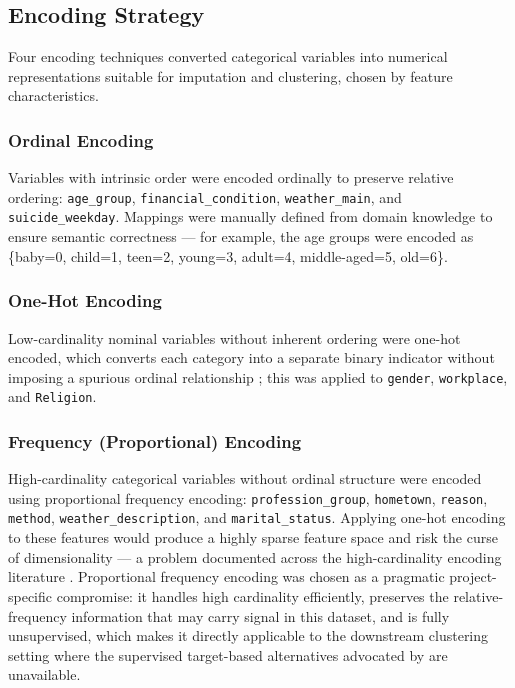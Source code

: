 \subsection{Encoding Strategy}

Four encoding techniques converted categorical variables into numerical representations suitable for imputation and clustering, chosen by feature characteristics.

\subsubsection{Ordinal Encoding}

Variables with intrinsic order were encoded ordinally to preserve relative ordering: \texttt{age\_group}, \texttt{financial\_condition}, \texttt{weather\_main}, and \texttt{suicide\_weekday}. Mappings were manually defined from domain knowledge to ensure semantic correctness --- for example, the age groups were encoded as \{baby=0, child=1, teen=2, young=3, adult=4, middle-aged=5, old=6\}.

\subsubsection{One-Hot Encoding}

Low-cardinality nominal variables without inherent ordering were one-hot encoded, which converts each category into a separate binary indicator without imposing a spurious ordinal relationship \cite{ref41}; this was applied to \texttt{gender}, \texttt{workplace}, and \texttt{Religion}.

\subsubsection{Frequency (Proportional) Encoding}

High-cardinality categorical variables without ordinal structure were encoded using proportional frequency encoding: \texttt{profession\_group}, \texttt{hometown}, \texttt{reason}, \texttt{method}, \texttt{weather\_description}, and \texttt{marital\_status}. Applying one-hot encoding to these features would produce a highly sparse feature space and risk the curse of dimensionality --- a problem documented across the high-cardinality encoding literature \cite{ref42}. Proportional frequency encoding was chosen as a pragmatic project-specific compromise: it handles high cardinality efficiently, preserves the relative-frequency information that may carry signal in this dataset, and is fully unsupervised, which makes it directly applicable to the downstream clustering setting where the supervised target-based alternatives advocated by \cite{ref42} are unavailable.

